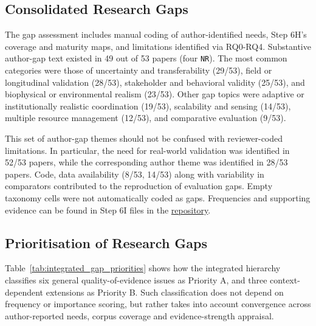 \documentclass[11pt,a4paper]{article}
\begin{document}
\subsection{Consolidated Research Gaps}

The gap assessment includes manual coding of author-identified needs,
Step 6H's coverage and maturity maps, and limitations identified
via RQ0-RQ4. Substantive author-gap text existed in 49 out of 53 papers
(four \texttt{NR}). The most common categories were those of uncertainty and
transferability (29/53), field or longitudinal validation (28/53),
stakeholder and behavioral validity (25/53), and biophysical or
environmental realism (23/53). Other gap topics were adaptive or
institutionally realistic coordination (19/53), scalability and sensing
(14/53), multiple resource management (12/53), and comparative evaluation
(9/53).

This set of author-gap themes should not be confused with reviewer-coded
limitations. In particular, the need for real-world validation was
identified in 52/53 papers, while the corresponding author theme
was identified in 28/53 papers. Code, data availability (8/53, 14/53)
along with variability in comparators contributed to the reproduction of
evaluation gaps. Empty taxonomy cells were not automatically coded as gaps.
Frequencies and supporting evidence can be found in Step 6I files in the \href{https://github.com/ChayanTalukder/Multi-Agent-Systems-for-Sustainable-Smart-Farming} {repository}.

\subsection{Prioritisation of Research Gaps}

Table~\ref{tab:integrated_gap_priorities} shows how the integrated hierarchy classifies six general quality-of-evidence issues as Priority A, and three context-dependent extensions as Priority B. Such classification does not depend on frequency or importance scoring, but rather takes into account convergence across author-reported needs, corpus coverage and evidence-strength appraisal.
\end{document}
